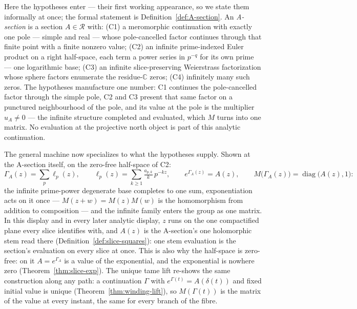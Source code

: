 \documentclass[11pt]{article}
\newcommand{\CC}{\mathbb{C}}
\theoremstyle{plain}
\theoremstyle{definition}
\theoremstyle{remark}
\begin{document}
Here the hypotheses enter --- their first working appearance, so we state them informally at
once; the formal statement is Definition~\ref{def:A-section}. An \emph{A-section} is a
section $A\in\mathcal R$ with: \textup{(C1)} a meromorphic continuation with exactly one pole
--- simple and real --- whose pole-cancelled factor continues through that finite point with a
finite nonzero value; \textup{(C2)} an infinite prime-indexed Euler
product on a right half-space, each term a power series in $p^{-q}$ for its own prime ---
one logarithmic base;
\textup{(C3)} an infinite slice-preserving
Weierstrass factorization whose sphere factors enumerate the residue-$\CC$ zeros;
\textup{(C4)} infinitely many such zeros. The hypotheses manufacture one number: C1 continues the pole-cancelled factor through
the simple pole, C2 and C3 present that same factor on a punctured neighbourhood of the pole, and its value at
the pole is the multiplier $u_A\neq0$ --- the infinite structure completed and evaluated,
which $M$ turns into one matrix.  No evaluation at the projective north object is part of
this analytic continuation.

The general machine now specializes to what the hypotheses supply. Shown at
the A-section itself, on the zero-free half-space of \textup{C2}:
\[
  \Gamma_A(z)=\sum_{p}\ell_p(z),\qquad
  \ell_p(z)=\sum_{k\ge1}\tfrac{a_{p,k}}{k}\,p^{-kz},\qquad
  e^{\Gamma_A(z)}=A(z),\qquad
  M\big(\Gamma_A(z)\big)=\operatorname{diag}\big(A(z),1\big):
\]
the infinite prime-power degenerate base completes to one sum, exponentiation
acts on it once --- $M(z+w)=M(z)M(w)$ is the homomorphism from addition to
composition --- and the infinite family enters the group as one matrix.
In this display and in every later analytic display, $z$ runs on the one
compactified plane every slice identifies with, and $A(z)$ is the
A-section's one holomorphic stem read there
(Definition~\ref{def:slice-squares}): one stem evaluation is the
section's evaluation on every slice at once. This
is also why the half-space is zero-free: on it $A=e^{\Gamma_A}$ is a value
of the exponential, and the exponential is nowhere zero
(Theorem~\ref{thm:slice-exp}). The
unique tame lift re-shows the same construction along any path: a
continuation $\Gamma$ with $e^{\Gamma(t)}=A(\delta(t))$ and fixed initial
value is unique (Theorem~\ref{thm:winding-lift}), so $M(\Gamma(t))$ is the
matrix of the value at every instant, the same for every branch of the
fibre.
\end{document}
